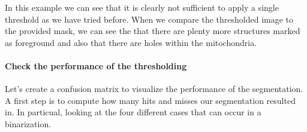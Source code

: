 \documentclass[letterpaper,10pt,english]{sphinxmanual}
\begin{document}
\begin{sphinxVerbatim}[commandchars=\\\{\}]
\PYG{p}{[}\PYG{p}{]}      \PYG{p}{[}\PYG{p}{]}             \PYG{p}{[}\PYG{p}{]}
\end{sphinxVerbatim}

\noindent{}

\sphinxAtStartPar
In this example we can see that it is clearly not sufficient to apply a single threshold as we have tried before. When we compare the thresholded image to the provided mask, we can see the that there are plenty more structures marked as foreground and also that there are holes within the mitochondria.


\paragraph{Check the performance of the thresholding}
\label{\detokenize{04-BasicSegmentation_Part2:check-the-performance-of-the-thresholding}}
\sphinxAtStartPar
Let’s create a confusion matrix to visualize the performance of the segmentation. A first step is to compute how many hits and misses our segmentation resulted in. In particual, looking at the four different cases that can occur in a binarization.
\end{document}
